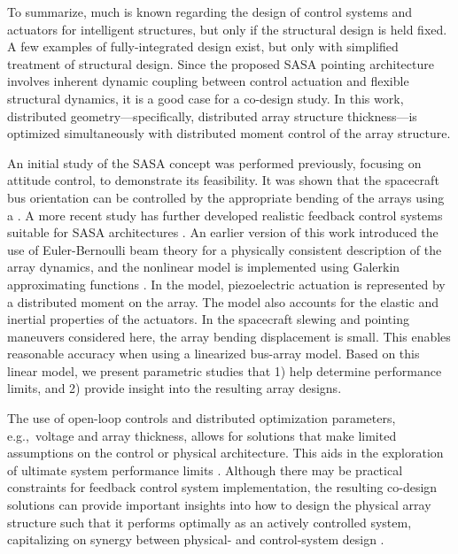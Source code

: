 To summarize, much is known regarding the design of control systems and actuators for intelligent structures, but only if the structural design is held fixed. A few examples of fully-integrated design exist, but only with simplified treatment of structural design. Since the proposed SASA pointing architecture involves inherent dynamic coupling between control actuation and flexible structural dynamics, it is a good case for a co-design study. In this work, distributed geometry---specifically, distributed array structure thickness---is optimized simultaneously with distributed moment control of the array structure.

An initial study of the SASA concept was performed previously, focusing on attitude control, to demonstrate its feasibility. It was shown that the spacecraft bus orientation can be controlled by the appropriate bending of the arrays using a . A more recent study has further developed realistic feedback control systems suitable for SASA architectures \cite{Herber2014c, Salazar2016a, Yu2005a}.
An earlier version \cite{Chilan2016a} of this work introduced the use of Euler-Bernoulli beam theory for a physically consistent description of the array dynamics, and the nonlinear  model is implemented using Galerkin approximating functions \cite{Bisplinghoff1996a, Junkins1993a, Paranjape2013a}. In the model, piezoelectric actuation is represented by a distributed moment on the array. The model also accounts for the elastic and inertial properties of the actuators. In the spacecraft slewing and pointing maneuvers considered here, the array bending displacement is small. This enables reasonable accuracy when using a linearized bus-array model. Based on this linear model, we present parametric studies that 1) help determine  performance limits, and 2) provide insight into the resulting array designs.

The use of open-loop controls and distributed optimization parameters, e.g.,~voltage and array thickness, allows for solutions that make limited assumptions on the control or physical architecture. This aids in the exploration of ultimate system performance limits \cite{Allison2014b}. Although there may be practical constraints for feedback control system implementation, the resulting co-design solutions can provide important insights into how to design the physical array structure such that it performs optimally as an actively controlled system, capitalizing on synergy between physical- and control-system design \cite{Deshmukh2015a}.

